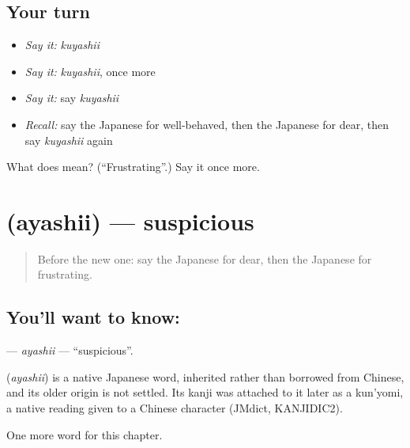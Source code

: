 \subsection*{Your turn}
\begin{itemize}
\raggedright
  \item \emph{Say it:} \emph{kuyashii}
  \item \emph{Say it:} \emph{kuyashii}, once more
  \item \emph{Say it:} say \emph{kuyashii}
  \item \emph{Recall:} say the Japanese for well-behaved, then the Japanese for dear, then say \emph{kuyashii} again
\end{itemize}

\begin{tcolorbox}[breakable,colback=teal!4,colframe=teal!35!black,title={Before you move on}]
What does  mean? (\textquotedblleft{}Frustrating\textquotedblright{}.) Say it once more.
\end{tcolorbox}
\section[\texorpdfstring{\ja{あやしい} (ayashii)}{あやしい (ayashii)}]{ (ayashii) — suspicious}

\label{lesson:JA-C123-ayashii}



\begin{quote}
Before the new one: say the Japanese for dear, then the Japanese for frustrating.
\end{quote}

\subsection*{You'll want to know: }
\textbf{} — \emph{ayashii} — \textquotedblleft{}suspicious\textquotedblright{}.

\begin{cousinweb}
\textbf{} (\emph{ayashii}) is a native Japanese word, inherited rather than borrowed from Chinese, and its older origin is not settled. Its kanji was attached to it later as a kun'yomi, a native reading given to a Chinese character (JMdict, KANJIDIC2).
\end{cousinweb}

\begin{grammarlens}[title={What you've built}]
One more word for this chapter.
\end{grammarlens}

